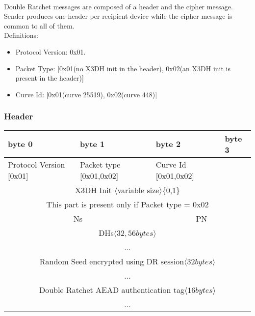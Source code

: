\documentclass[a4paper,11pt]{article}
\begin{document}
    \paragraph*{}Double Ratchet messages are composed of a header and the cipher message. Sender produces one header per recipient device while the cipher message is common to all of them.\\
      Definitions:
      \begin{itemize}
      \item Protocol Version: 0x01.
      \item Packet Type: [0x01(no X3DH init in the header), 0x02(an X3DH init is present in the header)]
      \item Curve Id: [0x01(curve 25519), 0x02(curve 448)]
      \end{itemize}

      \subsubsection{Header}
      \begin{center}
      \begin{tabular}{ | p{1.4in} | p{1.4in} | p{1.4in} | p{1.4in} |}
        \hline
        \cellcolor[gray]{0.85} byte 0 & \cellcolor[gray]{0.85} byte 1 & \cellcolor[gray]{0.85} byte 2 & \cellcolor[gray]{0.85}byte 3\\
        \hline
        Protocol Version [0x01] & Packet type [0x01,0x02] & Curve Id [0x01,0x02] & \\
        \cline{1-3}
        \multicolumn{4}{|c|}{X3DH Init $\langle $variable size$\rangle $\{0,1\}}\\
        \multicolumn{4}{|c|}{This part is present only if Packet type = 0x02}\\
        \hline
        \multicolumn{2}{|c}{Ns}&\multicolumn{2}{|c|}{PN}\\
        \hline
        \multicolumn{4}{|c|}{DHs$\langle 32,56 bytes\rangle $}\\
        \multicolumn{4}{|c|}{...}\\
        \hline
        \multicolumn{4}{|c|}{Random Seed encrypted using DR session$\langle 32bytes\rangle $}\\
        \multicolumn{4}{|c|}{...}\\
        \hline
        \multicolumn{4}{|c|}{Double Ratchet AEAD authentication tag$\langle 16bytes\rangle $}\\
        \multicolumn{4}{|c|}{...}\\
        \hline
      \end{tabular}
      \end{center}
      
\end{document}
